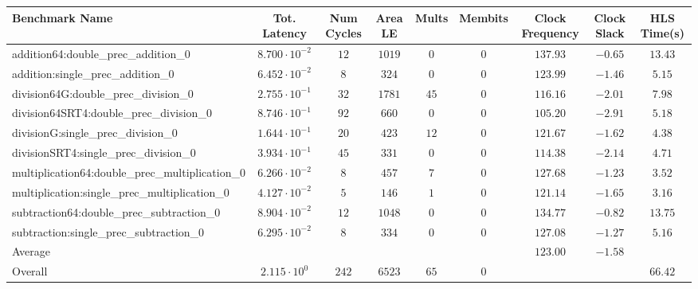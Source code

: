 \begin{tabular}{|l|c|c|c|c|c|c|c|c|}
\hline
Benchmark Name                                   & Tot. Latency            & Num Cycles & Area LE  & Mults  & Membits & Clock Frequency & Clock Slack & HLS Time(s) \\
\hline
addition64:double\_prec\_addition\_0             & $ 8.700 \cdot 10^{-2} $ & $ 12     $ & $ 1019 $ & $ 0  $ & $ 0   $ & $ 137.93      $ & $ -0.65   $ & $ 13.43   $ \\
addition:single\_prec\_addition\_0               & $ 6.452 \cdot 10^{-2} $ & $ 8      $ & $ 324  $ & $ 0  $ & $ 0   $ & $ 123.99      $ & $ -1.46   $ & $ 5.15    $ \\
division64G:double\_prec\_division\_0            & $ 2.755 \cdot 10^{-1} $ & $ 32     $ & $ 1781 $ & $ 45 $ & $ 0   $ & $ 116.16      $ & $ -2.01   $ & $ 7.98    $ \\
division64SRT4:double\_prec\_division\_0         & $ 8.746 \cdot 10^{-1} $ & $ 92     $ & $ 660  $ & $ 0  $ & $ 0   $ & $ 105.20      $ & $ -2.91   $ & $ 5.18    $ \\
divisionG:single\_prec\_division\_0              & $ 1.644 \cdot 10^{-1} $ & $ 20     $ & $ 423  $ & $ 12 $ & $ 0   $ & $ 121.67      $ & $ -1.62   $ & $ 4.38    $ \\
divisionSRT4:single\_prec\_division\_0           & $ 3.934 \cdot 10^{-1} $ & $ 45     $ & $ 331  $ & $ 0  $ & $ 0   $ & $ 114.38      $ & $ -2.14   $ & $ 4.71    $ \\
multiplication64:double\_prec\_multiplication\_0 & $ 6.266 \cdot 10^{-2} $ & $ 8      $ & $ 457  $ & $ 7  $ & $ 0   $ & $ 127.68      $ & $ -1.23   $ & $ 3.52    $ \\
multiplication:single\_prec\_multiplication\_0   & $ 4.127 \cdot 10^{-2} $ & $ 5      $ & $ 146  $ & $ 1  $ & $ 0   $ & $ 121.14      $ & $ -1.65   $ & $ 3.16    $ \\
subtraction64:double\_prec\_subtraction\_0       & $ 8.904 \cdot 10^{-2} $ & $ 12     $ & $ 1048 $ & $ 0  $ & $ 0   $ & $ 134.77      $ & $ -0.82   $ & $ 13.75   $ \\
subtraction:single\_prec\_subtraction\_0         & $ 6.295 \cdot 10^{-2} $ & $ 8      $ & $ 334  $ & $ 0  $ & $ 0   $ & $ 127.08      $ & $ -1.27   $ & $ 5.16    $ \\
\hline
Average                                          & $                     $ & $        $ & $      $ & $    $ & $     $ & $ 123.00      $ & $ -1.58   $ & $         $ \\
\hline
Overall                                          & $ 2.115 \cdot 10^{0}  $ & $ 242    $ & $ 6523 $ & $ 65 $ & $ 0   $ & $             $ & $         $ & $ 66.42   $ \\
\hline
\end{tabular}
